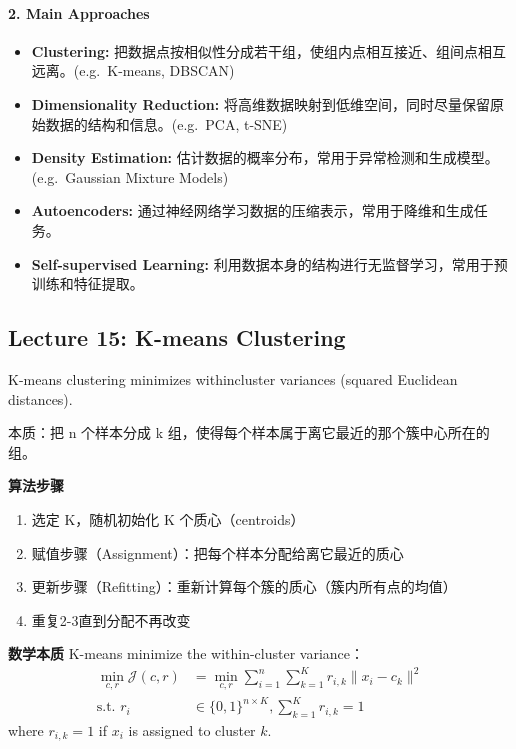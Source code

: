 \documentclass[
]{ctexart}
\providecommand{\tightlist}{%
  \setlength{\itemsep}{0pt}\setlength{\parskip}{0pt}}
\begin{document}
\paragraph{2. Main Approaches}\label{main-approaches}

\begin{itemize}
\tightlist
\item
  \textbf{Clustering:}
  把数据点按相似性分成若干组，使组内点相互接近、组间点相互远离。(e.g.~K-means,
  DBSCAN)
\item
  \textbf{Dimensionality Reduction:}
  将高维数据映射到低维空间，同时尽量保留原始数据的结构和信息。(e.g.~PCA,
  t-SNE)
\item
  \textbf{Density Estimation:}
  估计数据的概率分布，常用于异常检测和生成模型。(e.g.~Gaussian Mixture
  Models)
\item
  \textbf{Autoencoders:}
  通过神经网络学习数据的压缩表示，常用于降维和生成任务。
\item
  \textbf{Self-supervised Learning:}
  利用数据本身的结构进行无监督学习，常用于预训练和特征提取。
\end{itemize}


\clearpage

\subsection{Lecture 15: K-means
Clustering}\label{lecture-15-k-means-clustering}

K-means clustering minimizes withincluster variances (squared Euclidean
distances).

本质：把 n 个样本分成 k
组，使得每个样本属于离它最近的那个簇中心所在的组。

\textbf{算法步骤}

\begin{enumerate}
\def\labelenumi{\arabic{enumi}.}
\tightlist
\item
  选定 K，随机初始化 K 个质心（centroids）
\item
  赋值步骤（Assignment）：把每个样本分配给离它最近的质心
\item
  更新步骤（Refitting）：重新计算每个簇的质心（簇内所有点的均值）
\item
  重复2-3直到分配不再改变
\end{enumerate}

\textbf{数学本质} K-means minimize the within-cluster variance：
\[ \begin{aligned}
\min_{c,r} \mathcal{J}(c,r) &= \min_{c,r} \sum_{i=1}^n \sum_{k=1}^K r_{i,k} \| x_i - c_k \|^2 \\
\text{s.t. } r_i &\in \{0,1\}^{n \times K}, \sum_{k=1}^K r_{i,k} = 1
\end{aligned} \] where \(r_{i,k} = 1\) if \(x_i\) is assigned to cluster
\(k\).
\end{document}
